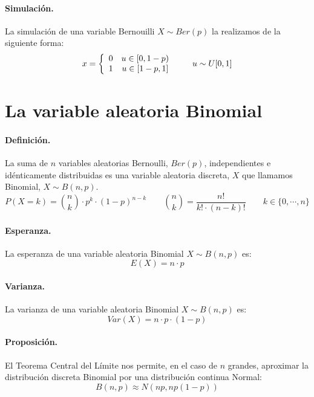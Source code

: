 \paragraph{Simulaci\'on.} La simulaci\'on de una variable Bernouilli 
$X \sim Ber(p)$ la realizamos de la siguiente forma:
\begin{displaymath}
x= \left\{
\begin{array}{cc}
0 & u \in [0,1-p) \cr
1 & u \in [1-p,1]
\end{array}
\right.
\qquad u \sim U[0,1]
\end{displaymath}


\section{La variable aleatoria Binomial}

\paragraph{Definici\'on.} La suma de $n$ variables aleatorias Bernoulli, $Ber(p)$,  
independientes e id\'enticamente distribuidas es una variable aleatoria discreta, 
$X$ que llamamos Binomial, $X \sim B(n,p)$.
\begin{displaymath}
P(X=k) = {n \choose k} \cdot p^k \cdot (1-p)^{n-k} \qquad {n \choose k} = \frac{n!}{k! \cdot (n-k)!}
\qquad k \in \{0, \cdots, n\}
\end{displaymath}

\paragraph{Esperanza.} La esperanza de una variable aleatoria Binomial 
$X \sim B(n,p)$ es:
\begin{displaymath}
E(X) = n \cdot p
\end{displaymath}

\paragraph{Varianza.} La varianza de una variable aleatoria Binomial 
$X \sim B(n,p)$ es:
\begin{displaymath}
Var(X)= n \cdot p \cdot (1-p)
\end{displaymath}

\paragraph{Proposici\'on.} El Teorema Central del L\'imite nos permite, en el
caso de $n$ grandes, aproximar la distribuci\'on discreta Binomial por una 
distribuci\'on continua Normal:
\begin{displaymath}
B(n,p) \approx N\left(n p, n p (1-p)\right)
\end{displaymath}


